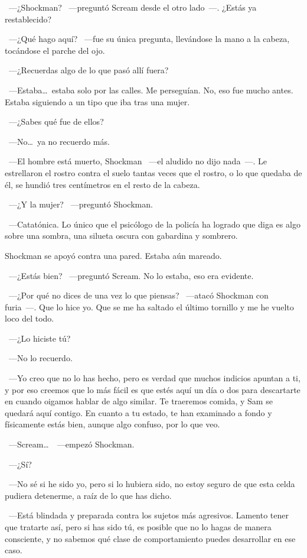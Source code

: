 ~---¿Shockman? ~---preguntó Scream desde el otro lado~---. ¿Estás ya restablecido?

~---¿Qué hago aquí? ~---fue su única pregunta, llevándose la mano a la cabeza, tocándose el parche del ojo.

~---¿Recuerdas algo de lo que pasó allí fuera?

~---Estaba\dots\ estaba solo por las calles. Me perseguían. No, eso fue mucho antes. Estaba siguiendo a un tipo que iba tras una mujer.

~---¿Sabes qué fue de ellos?

~---No\dots\ ya no recuerdo más.

~---El hombre está muerto, Shockman ~---el aludido no dijo nada~---. Le estrellaron el rostro contra el suelo tantas veces que el rostro, o lo que quedaba de él, se hundió tres centímetros en el resto de la cabeza.

~---¿Y la mujer? ~---preguntó Shockman.

~---Catatónica. Lo único que el psicólogo de la policía ha logrado que diga es algo sobre una sombra, una silueta oscura con gabardina y sombrero.

Shockman se apoyó contra una pared. Estaba aún mareado.

~---¿Estás bien? ~---preguntó Scream. No lo estaba, eso era evidente.

~---¿Por qué no dices de una vez lo que piensas? ~---atacó Shockman con furia~---. Que lo hice yo. Que se me ha saltado el último tornillo y me he vuelto loco del todo.

~---¿Lo hiciste tú?

~---No lo recuerdo.

~---Yo creo que no lo has hecho, pero es verdad que muchos indicios apuntan a ti, y por eso creemos que lo más fácil es que estés aquí un día o dos para descartarte en cuando oigamos hablar de algo similar. Te traeremos comida, y Sam se quedará aquí contigo. En cuanto a tu estado, te han examinado a fondo y físicamente estás bien, aunque algo confuso, por lo que veo.

~---Scream\dots\ ~---empezó Shockman.

~---¿Sí?

~---No sé si he sido yo, pero si lo hubiera sido, no estoy seguro de que esta celda pudiera detenerme, a raíz de lo que has dicho.

~---Está blindada y preparada contra los sujetos más agresivos. Lamento tener que tratarte así, pero si has sido tú, es posible que no lo hagas de manera consciente, y no sabemos qué clase de comportamiento puedes desarrollar en ese caso.

